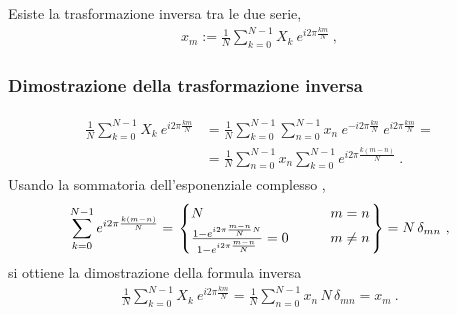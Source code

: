 \documentclass[letterpaper,10pt,italian]{jupyterBook}
\begin{document}
\sphinxAtStartPar
{} Esiste la trasformazione inversa tra le due serie,
\begin{equation*}
\begin{split}x_m := \frac{1}{N} \sum_{k=0}^{N-1} X_k \ e^{i 2 \pi \frac{k m}{N}} \ ,\end{split}
\end{equation*}\subsubsection*{Dimostrazione della trasformazione inversa}
\begin{equation*}
\begin{split}\begin{aligned}
 \frac{1}{N} \sum_{k=0}^{N-1} X_k \ e^{i 2 \pi \frac{k m}{N}} 
  & = \frac{1}{N} \sum_{k=0}^{N-1} \sum_{n=0}^{N-1} x_n \ e^{-i 2 \pi \frac{k n}{N}}  \ e^{i 2 \pi \frac{k m}{N}} = \\ 
  & = \frac{1}{N} \sum_{n=0}^{N-1} x_n  \sum_{k=0}^{N-1}  e^{i 2 \pi \frac{k (m-n)}{N}} \ .
\end{aligned}\end{split}
\end{equation*}
\sphinxAtStartPar
Usando la sommatoria dell’esponenziale complesso {\hyperref[\detokenize{ch/algebra/complex-algebra:sum-complex-exponential-series}]{}},
\begin{equation*}
\begin{split}\sum_{k=0}^{N-1}  e^{i 2 \pi \frac{k (m-n)}{N}} =
  \left.\begin{cases}
     N                     & \hfill \qquad m = n \\
     \frac{1-e^{i 2 \pi \frac{m-n}{N} N}}{1-e^{i 2 \pi \frac{m-n}{N}}} = 0  & \hfill \qquad m \ne n
  \end{cases}\right\} = N \, \delta_{mn} \ ,
\end{split}
\end{equation*}
\sphinxAtStartPar
si ottiene la dimostrazione della formula inversa
\begin{equation*}
\begin{split}\frac{1}{N} \sum_{k=0}^{N-1} X_k \ e^{i 2 \pi \frac{k m}{N}}  = \frac{1}{N} \sum_{n=0}^{N-1} x_n  \, N \, \delta_{mn} = x_m \ .\end{split}
\end{equation*}\label{ch/algebra/complex-algebra:sum-complex-exponential-series}
\end{document}
